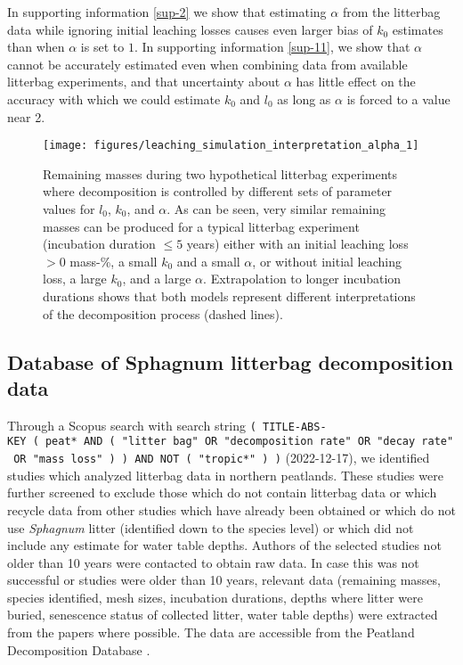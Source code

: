 \documentclass[bg, manuscript]{copernicus}
\begin{document}
In supporting information \ref{sup-2} we show that estimating \(\alpha\) from the litterbag data while ignoring initial leaching losses causes even larger bias of \(k_0\) estimates than when \(\alpha\) is set to \(1\). In supporting information \ref{sup-11}, we show that \(\alpha\) cannot be accurately estimated even when combining data from available litterbag experiments, and that uncertainty about \(\alpha\) has little effect on the accuracy with which we could estimate \(k_0\) and \(l_0\) as long as \(\alpha\) is forced to a value near 2.



\begin{figure}[H]

{\centering \texttt{[image: figures/leaching\_simulation\_interpretation\_alpha\_1]} 

}

\caption{Remaining masses during two hypothetical litterbag experiments where decomposition is controlled by different sets of parameter values for \(l_0\), \(k_0\), and \(\alpha\). As can be seen, very similar remaining masses can be produced for a typical litterbag experiment (incubation duration \(\le5\) years) either with an initial leaching loss \(>0\) mass-\%, a small \(k_0\) and a small \(\alpha\), or without initial leaching loss, a large \(k_0\), and a large \(\alpha\). Extrapolation to longer incubation durations shows that both models represent different interpretations of the decomposition process (dashed lines).}\label{fig:out-leaching-sim-interpretation-alpha}
\end{figure}

\subsection{Database of Sphagnum litterbag decomposition data}

Through a Scopus search with search string \texttt{(\ TITLE-ABS-KEY\ (\ peat*\ AND\ (\ "litter\ bag"\ OR\ "decomposition\ rate"\ OR\ "decay\ rate"\ OR\ "mass\ loss"\ )\ )\ AND\ NOT\ (\ "tropic*"\ )\ )} (2022-12-17), we identified studies which analyzed litterbag data in northern peatlands. These studies were further screened to exclude those which do not contain litterbag data or which recycle data from other studies which have already been obtained or which do not use \emph{Sphagnum} litter (identified down to the species level) or which did not include any estimate for water table depths. Authors of the selected studies not older than 10 years were contacted to obtain raw data. In case this was not successful or studies were older than 10 years, relevant data (remaining masses, species identified, mesh sizes, incubation durations, depths where litter were buried, senescence status of collected litter, water table depths) were extracted from the papers where possible. The data are accessible from the Peatland Decomposition Database \citep{Teickner.2024c}.
\end{document}
